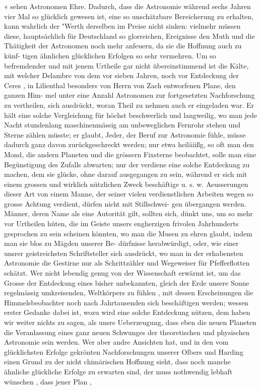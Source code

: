 \documentclass[12pt,a4paper]{article}
\begin{document}
« sehen  Astronomen  Ehre.  Dadurch,  dass  die  Astronomie  während  sechs  Jahren  vier  Mal  so  glücklich gewesen  ist,  eine  so  unschätzbare  Bereicherung  zu  erhalten,  kann  wahrlich  der  "Werth  derselben  im Preise  nicht  sinken:  vielmehr  müssen  diese,  hauptsächlich  für  Deutschland  so  glorreichen,  Ereignisse den  Muth  und  die  Thätigkeit  der  Astronomen  noch  mehr  anfeuern,  da  sie  die  Hoffnung  auch  zu  künf- tigen ähnlichen  glücklichen  Erfolgen  so  sehr  vermehren.  Um  so  befremdender  und  mit  jenem  Urtheile gar  nicht  übereinstimmend  ist  die  Kälte,  mit  welcher  Delambre  von  dem  vor  sieben  Jahren,  noch  vor Entdeckung  der  Ceres ,  in  Lilienthal  besonders  von  Herrn  von  Zach  entworfenen  Plane,  den  ganzen  Him- mel unter  eine  Anzahl  Astronomen  zur  fortgesetzten  Nachforschung  zu  vertheilen,  sich  ausdrückt,  woran Theil  zu  nehmen  auch  er  eingeladen  war.  Er  hält  eine  solche  Vergleichung  für  höchst  beschwerlich  und langweilig,  wo  man  jede  Nacht  stundenlang  maschinenmässig  am  unbeweglichen  Fernrohr  stehen  und Sterne  zählen  müsste;  er  glaubt,  Jeder,  der  Beruf  zur  Astronomie  fühle,  müsse  dadurch  ganz  davon zurückgeschreckt  werden;  nur  etwa  heiläiißg,  so  oft  man  den  Mond,  die  andern  Planeten  und  die  grössern Fixsterne  beobachtet,  solle  man  eine  Begünstigung  des  Zufalls  abwarten;  nur  der  verdiene  eine  solche Entdeckung  zu  machen,  dem  sie  glücke,  ohne  darauf  ausgegangen  zu  sein,  während  er  sich  mit  einem grossen  und  wirklich  nützlichen  Zweck  beschäftige  u.  s.  w.  Aeusserungen  dieser  Art  von  einem  Manne,  der seiner  vielen  verdienstlichen  Arbeiten  wegen  so  grosse  Achtung  verdient,  dürfen  nicht  mit  Stillschwei- gen übergangen  werden.  Männer,  deren  Name  als  eine  Autorität  gilt,  sollten  sich,  dünkt  uns,  um  so mehr  vor  Urtheilen  hüten,  die  im  Geiste  unsers  engherzigen  frivolen  Jahrhunderts  gesprochen  zu  sein scheinen  könnten,  wo  man  die  Musen  zu  ehren  glaubt,  indem  man  sie  blos  zu  Mägden  unserer  Be- dürfnisse herabwürdigt,  oder,  wie  einer  unsrer  geistreichsten  Schriftsteller  sich  ausdrückt,  wo  man  in der  erhabensten  Astronomie  die  Gestirne  nur  als  Schrittzähler  und  Wegeweiser  für  Pfefferflotten  schätzt. Wer  nicht  lebendig  genug  von  der  Wissenschaft  erwärmt  ist,  um  das  Grosse  der  Entdeckung  eines  bisher unbekannten,  gleich  der  Erde  unsere  Sonne  regelmässig  umkreisenden,  Weltkörpers  zu  fühlen ,  mit  dessen Erscheinungen  die  Himmelsbeobachter  noch  nach  Jahrtausenden  sich  beschäftigen  werden;  wessen  erster Gedanke  dabei  ist,  wozu  wird  eine  solche  Entdeckung  nützen,  dem  haben  wir  weiter  nichts  zu  sagen, als  unsre  Ueberzeugung,  dass  eben  die  neuen  Planeten  die  Veranlassung  eines  ganz  neuen  Schwunges der  theoretischen  und  physischen  Astronomie  sein  werden.  Wer  aber  andre  Ansichten  hat,  und  in  den vom  glücklichsten  Erfolge  gekrönten  Nachforschungen  unserer  Olbers  und  Harding  einen  Grund  zu  der nicht  chimärischen  Hoffnung  sieht,  dass  noch  manche  ähnliche  glückliche  Erfolge  zu  erwarten  sind,  der muss  nothwendig  lebhaft  wünschen ,  dass  jener  Plan ,  
\end{document}
